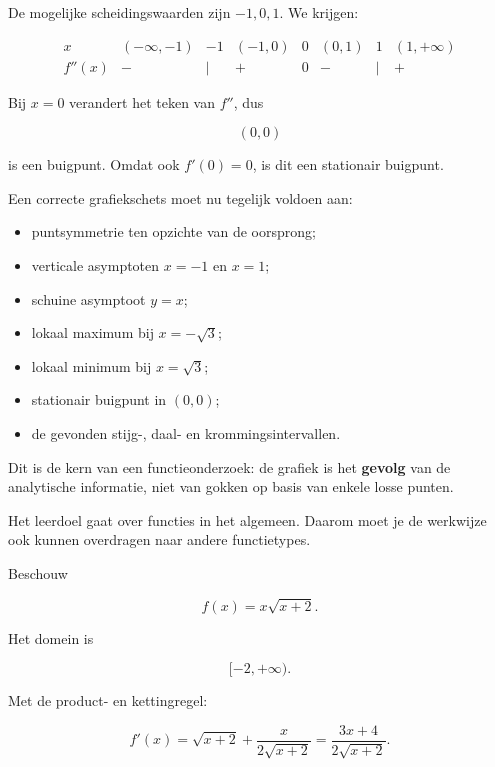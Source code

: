 \documentclass{ximera}
\begin{document}
De mogelijke scheidingswaarden zijn \(-1,0,1\). We krijgen:

\[
\begin{array}{c|ccccccc}
x&(-\infty,-1)&-1&(-1,0)&0&(0,1)&1&(1,+\infty)\\
\hline
f''(x)&-&\mid&+&0&-&\mid&+
\end{array}
\]

Bij \(x=0\) verandert het teken van \(f''\), dus

\[
\boxed{(0,0)}
\]

is een buigpunt. Omdat ook \(f'(0)=0\), is dit een stationair buigpunt.


Een correcte grafiekschets moet nu tegelijk voldoen aan:

\begin{itemize}
  \item puntsymmetrie ten opzichte van de oorsprong;
  \item verticale asymptoten \(x=-1\) en \(x=1\);
  \item schuine asymptoot \(y=x\);
  \item lokaal maximum bij \(x=-\sqrt3\);
  \item lokaal minimum bij \(x=\sqrt3\);
  \item stationair buigpunt in \((0,0)\);
  \item de gevonden stijg-, daal- en krommingsintervallen.
\end{itemize}

Dit is de kern van een functieonderzoek: de grafiek is het
\textbf{gevolg} van de analytische informatie, niet van gokken op basis
van enkele losse punten.



Het leerdoel gaat over functies in het algemeen. Daarom moet je de
werkwijze ook kunnen overdragen naar andere functietypes.


Beschouw

\[f(x)=x\sqrt{x+2}.\]

Het domein is

\[[-2,+\infty).\]

Met de product- en kettingregel:

\[
f'(x)
=
\sqrt{x+2}+\frac{x}{2\sqrt{x+2}}
=
\frac{3x+4}{2\sqrt{x+2}}.
\]
\end{document}
